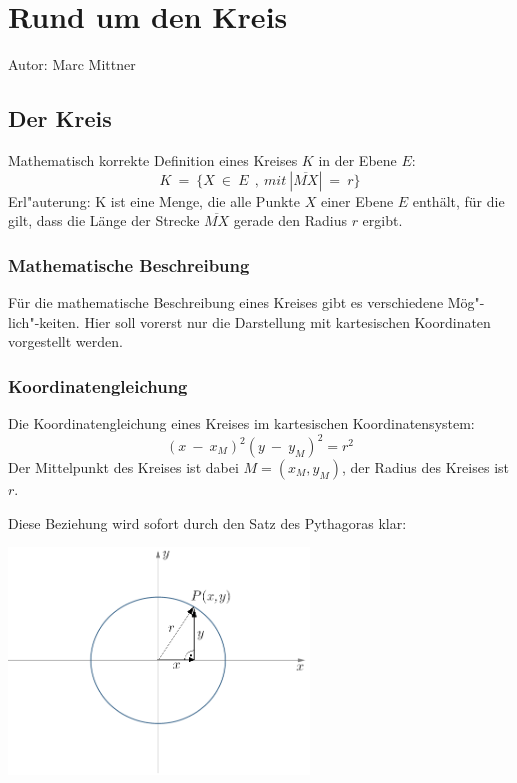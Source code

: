 \chapter{Rund um den Kreis}

Autor: Marc Mittner

\section{Der Kreis}

Mathematisch korrekte Definition eines Kreises $ K $ in der Ebene $ E $:
\[ K \ = \ \lbrace X \ \in \ E \ \ , \ mit \ |\overline {MX}| \ = \ r \rbrace \]
Erl"auterung: K ist eine Menge, die alle Punkte $ X $ einer Ebene $ E $ enthält, für die gilt, dass die Länge der Strecke $ \overline {MX} $ gerade den Radius $ r $ ergibt.

\subsection{Mathematische Beschreibung}
Für die mathematische Beschreibung eines Kreises gibt es verschiedene Mög"-lich"-keiten. Hier soll vorerst nur die Darstellung mit kartesischen Koordinaten vorgestellt werden.

\subsection{Koordinatengleichung}

Die Koordinatengleichung eines Kreises im kartesischen Koordinatensystem:
\[ (x \ - \ x_M)^2 (y \ - \ y_M)^2 = r^2 \]
Der Mittelpunkt des Kreises ist dabei $ M = (x_M , y_M) $, der Radius des Kreises ist $ r $.

Diese Beziehung wird sofort durch den Satz des Pythagoras klar:

\begin{center}
\includegraphics[width=0.6\textwidth]{img/Kreis.png}
\end{center}

